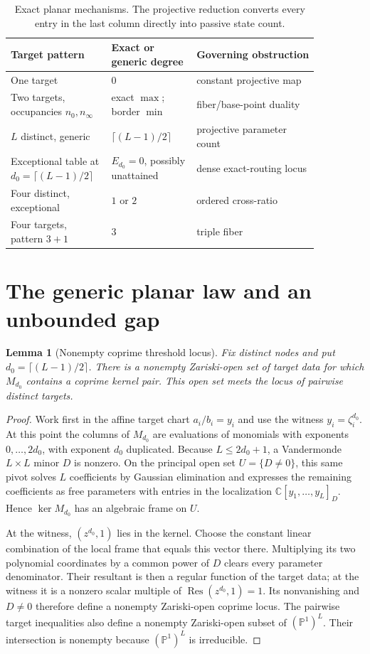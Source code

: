 \documentclass[11pt]{article}
\newtheorem{lemma}[theorem]{Lemma}
\theoremstyle{definition}\newtheorem{definition}[theorem]{Definition}\newtheorem{example}[theorem]{Example}
\theoremstyle{remark}\newtheorem{remark}[theorem]{Remark}\newtheorem{limitation}[theorem]{Limitation}
\newcommand{\C}{\mathbb C}\newcommand{\D}{\mathbb D}\newcommand{\T}{\mathbb T}
\newcommand{\PP}{\mathbb P}\newcommand{\rank}{\operatorname{rank}}
\newcommand{\Res}{\operatorname{Res}}\newcommand{\mcdeg}{\deg_{\mathrm{McM}}}
\begin{document}
\begin{table}[H]
\centering\small
\caption{Exact planar mechanisms.  The projective reduction converts every
entry in the last column directly into passive state count.}
\label{tab:mechanisms}
\begin{tabular}{@{}L{0.25\linewidth}L{0.25\linewidth}L{0.36\linewidth}@{}}\toprule
Target pattern & Exact or generic degree & Governing obstruction\\\midrule
One target & $0$ & constant projective map\\
Two targets, occupancies $n_0,n_\infty$ & exact $\max$; border $\min$ & fiber/base-point duality\\
$L$ distinct, generic & $\lceil(L-1)/2\rceil$ & projective parameter count\\
Exceptional table at $d_0=\lceil(L-1)/2\rceil$ & $E_{d_0}=0$, possibly unattained & dense exact-routing locus\\
Four distinct, exceptional & $1$ or $2$ & ordered cross-ratio\\
Four targets, pattern $3+1$ & $3$ & triple fiber\\
\bottomrule\end{tabular}
\end{table}

\section{The generic planar law and an unbounded gap}

\begin{lemma}[Nonempty coprime threshold locus]\label{lem:zariski}
Fix distinct nodes and put $d_0=\lceil(L-1)/2\rceil$.  There is a nonempty
Zariski-open set of target data for which $M_{d_0}$ contains a coprime kernel
pair.  This open set meets the locus of pairwise distinct targets.
\end{lemma}

\begin{proof}
Work first in the affine target chart $a_i/b_i=y_i$ and use the witness
$y_i=\zeta_i^{d_0}$.  At this point the columns of $M_{d_0}$ are evaluations
of monomials with exponents $0,\ldots,2d_0$, with exponent $d_0$ duplicated.
Because $L\le2d_0+1$, a Vandermonde $L\times L$ minor $D$ is nonzero.  On the
principal open set $U=\{D\ne0\}$, this same pivot solves $L$ coefficients by
Gaussian elimination and expresses the remaining coefficients as free
parameters with entries in the localization $\C[y_1,\ldots,y_L]_D$.  Hence
$\ker M_{d_0}$ has an algebraic frame on $U$.

At the witness, $(z^{d_0},1)$ lies in the kernel.  Choose the constant linear
combination of the local frame that equals this vector there.  Multiplying its
two polynomial coordinates by a common power of $D$ clears every parameter
denominator.  Their resultant is then a regular function of the target data;
at the witness it is a nonzero scalar multiple of
$\Res(z^{d_0},1)=1$.  Its nonvanishing and $D\ne0$ therefore define a nonempty
Zariski-open coprime locus.  The pairwise target inequalities also define a
nonempty Zariski-open subset of $(\PP^1)^L$.  Their intersection is nonempty
because $(\PP^1)^L$ is irreducible.
\end{proof}
\end{document}
